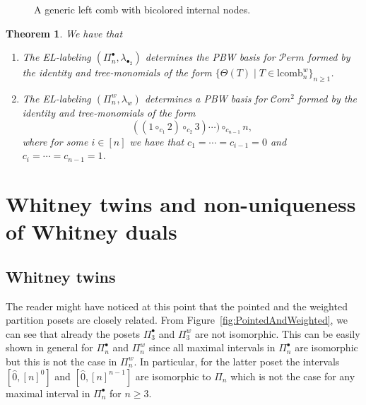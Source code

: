 \documentclass[11pt]{article}
\newtheorem{theo}{Theorem}[section]
\theoremstyle{definition}
\numberwithin{equation}{section}
\newcommand{\Perm}{\mathcal{P}erm}
\newcommand{\Com}{\mathcal{C}om}
\begin{document}
 \begin{figure}
     \centering
     \caption{A generic left comb with bicolored internal nodes.}
     \label{fig:left_comb}
 \end{figure}


 \begin{theo} We have that
 
 \begin{enumerate}
     \item The EL-labeling $(\Pi_n^{\bullet},\lambda_{\bullet_2})$ determines the PBW basis for $\Perm$ formed by the identity and tree-monomials of the form
  $\{\Theta(T) \mid T\in \mathrm{lcomb}_{n}^{w}\}_{n\ge 1}$.
  \item The EL-labeling $(\Pi_n^{w},\lambda_{w})$ determines a PBW basis for $\Com^2$ formed by the identity and tree-monomials of the form
  $$((1\circ_{c_1} 2)\circ_{c_2} 3)\cdots ) \circ_{c_{n-1}} n,$$
   where for some $i\in [n]$ we have that $c_1=\cdots =c_{i-1}=0$  and $c_i=\cdots =c_{n-1}=1$.
 \end{enumerate}
 \end{theo}
 

     
\section{Whitney twins and non-uniqueness of Whitney duals}\label{sec:twins}


\subsection{Whitney twins}
The reader might have noticed at this point that the pointed and the weighted partition posets are closely related.  From Figure~\ref{fig:PointedAndWeighted}, we can see that already the posets $\Pi_3^{\bullet}$ and $\Pi_3^{w}$ are not isomorphic. This can be easily shown in general for $\Pi_n^{\bullet}$ and $\Pi_n^{w}$ since all maximal intervals in $\Pi_n^{\bullet}$  are isomorphic but this is not the case in $\Pi_n^{w}$. In particular, for the latter poset the intervals $[\hat{0},[n]^0]$ and $[\hat{0},[n]^{n-1}]$ are isomorphic to $\Pi_n$ which is not the case for any maximal interval in $\Pi_n^{\bullet}$ for $n\ge 3$. 
\end{document}
